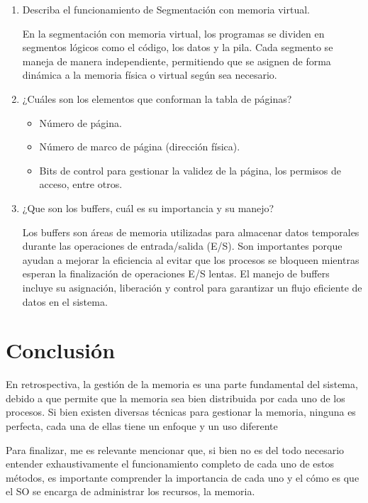 \documentclass[12pt, a4paper]{article} %
\begin{document}
\begin{enumerate}
	\item Describa el funcionamiento de Segmentación con memoria virtual.

		En la segmentación con memoria virtual, los programas se dividen en segmentos lógicos como el código, los datos y la pila. Cada segmento se maneja de manera independiente, permitiendo que se asignen de forma dinámica a la memoria física o virtual según sea necesario.

	\item ¿Cuáles son los elementos que conforman la tabla de páginas?

	\begin{itemize}
		\item Número de página.
		\item Número de marco de página (dirección física).
		\item Bits de control para gestionar la validez de la página, los permisos de acceso, entre otros.
	\end{itemize}

	\item ¿Que son los buffers, cuál es su importancia y su manejo?

		Los buffers son áreas de memoria utilizadas para almacenar datos temporales durante las operaciones de entrada/salida (E/S). Son importantes porque ayudan a mejorar la eficiencia al evitar que los procesos se bloqueen mientras esperan la finalización de operaciones E/S lentas. El manejo de buffers incluye su asignación, liberación y control para garantizar un flujo eficiente de datos en el sistema.
\end{enumerate}

\clearpage
\section{Conclusión}

En retrospectiva, la gestión de la memoria es una parte fundamental del sistema, debido a que permite que la memoria sea bien distribuida por cada uno de los procesos. Si bien existen diversas técnicas para gestionar la memoria, ninguna es perfecta, cada una de ellas tiene un enfoque y un uso diferente

Para finalizar, me es relevante mencionar que, si bien no es del todo necesario entender exhaustivamente el funcionamiento completo de cada uno de estos métodos, es importante comprender la importancia de cada uno y el cómo es que el SO se encarga de administrar los recursos, la memoria.

\nocite{*} %

\clearpage


\end{document}
